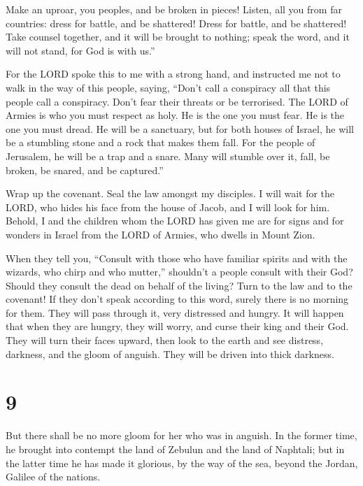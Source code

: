  Make an uproar, you peoples, and be broken in pieces!
Listen, all you from far countries: dress for battle, and be shattered!
Dress for battle, and be shattered!  Take counsel together,
and it will be brought to nothing; speak the word, and it will not
stand, for God is with us.''

 For the LORD spoke this to me with a strong hand, and
instructed me not to walk in the way of this people, saying,
 ``Don't call a conspiracy all that this people call a
conspiracy. Don't fear their threats or be terrorised.  The
LORD of Armies is who you must respect as holy. He is the one you must
fear. He is the one you must dread.  He will be a
sanctuary, but for both houses of Israel, he will be a stumbling stone
and a rock that makes them fall. For the people of Jerusalem, he will be
a trap and a snare.  Many will stumble over it, fall, be
broken, be snared, and be captured.''

 Wrap up the covenant. Seal the law amongst my disciples.
 I will wait for the LORD, who hides his face from the
house of Jacob, and I will look for him.  Behold, I and the
children whom the LORD has given me are for signs and for wonders in
Israel from the LORD of Armies, who dwells in Mount Zion.

 When they tell you, ``Consult with those who have familiar
spirits and with the wizards, who chirp and who mutter,'' shouldn't a
people consult with their God? Should they consult the dead on behalf of
the living?  Turn to the law and to the covenant! If they
don't speak according to this word, surely there is no morning for them.
 They will pass through it, very distressed and hungry. It
will happen that when they are hungry, they will worry, and curse their
king and their God. They will turn their faces upward, 
then look to the earth and see distress, darkness, and the gloom of
anguish. They will be driven into thick darkness.

\hypertarget{section-8}{%
\section{9}\label{section-8}}

 But there shall be no more gloom for her who was in
anguish. In the former time, he brought into contempt the land of
Zebulun and the land of Naphtali; but in the latter time he has made it
glorious, by the way of the sea, beyond the Jordan, Galilee of the
nations.

